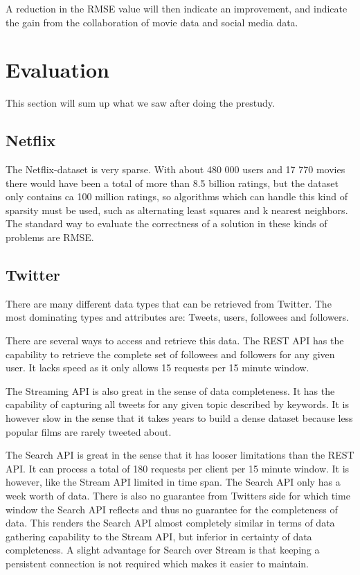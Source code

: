 A reduction in the RMSE value will then indicate an improvement, and indicate the gain from the collaboration of movie data and social media data.

\section{Evaluation}\label{sec:prestrud-eval}
This section will sum up what we saw after doing the prestudy.

\subsection{Netflix}
The Netflix-dataset is very sparse. With about 480 000 users and 17 770 movies there would have been a total of more than 8.5 billion ratings, but the dataset only contains ca 100 million ratings, so algorithms which can handle this kind of sparsity must be used, such as alternating least squares and k nearest neighbors. The standard way to evaluate the correctness of a solution in these kinds of problems are RMSE.

\subsection{Twitter}\label{sec:prestrud-eval-twitter}
There are many different data types that can be retrieved from Twitter. The most dominating types and attributes are: Tweets, users, followees and followers.

There are several ways to access and retrieve this data. The REST API has the capability to retrieve the complete set of followees and followers for any given user. It lacks speed as it only allows 15 requests per 15 minute window.

The Streaming API is also great in the sense of data completeness. It has the capability of capturing all tweets for any given topic described by keywords. It is however slow in the sense that it takes years to build a dense dataset because less popular films are rarely tweeted about.

The Search API is great in the sense that it has looser limitations than the REST API. It can process a total of 180 requests per client per 15 minute window. It is however, like the Stream API limited in time span. The Search API only has a week worth of data. There is also no guarantee from Twitters side for which time window the Search API reflects and thus no guarantee for the completeness of data. This renders the Search API almost completely similar in terms of data gathering capability to the Stream API, but inferior in certainty of data completeness. A slight advantage for Search over Stream is that keeping a persistent connection is not required which makes it easier to maintain.

